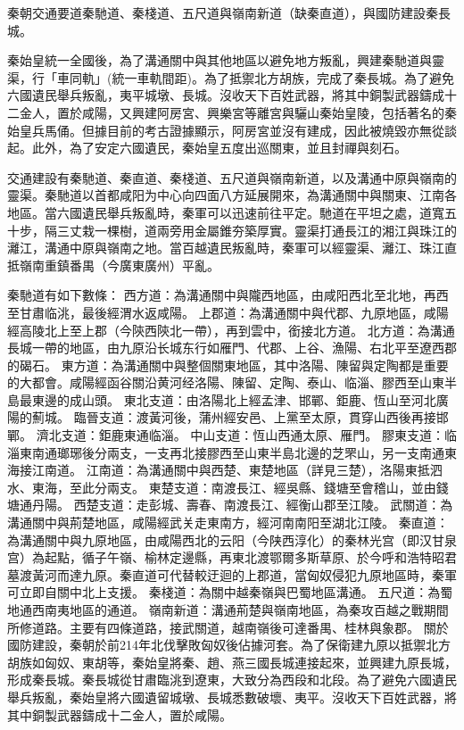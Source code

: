 秦朝交通要道秦馳道、秦棧道、五尺道與嶺南新道（缺秦直道），與國防建設秦長城。

秦始皇統一全國後，為了溝通關中與其他地區以避免地方叛亂，興建秦馳道與靈渠，行「車同軌」(統一車軌間距)。為了抵禦北方胡族，完成了秦長城。為了避免六國遺民舉兵叛亂，夷平城墩、長城。沒收天下百姓武器，將其中銅製武器鑄成十二金人，置於咸陽，又興建阿房宮、興樂宮等離宮與驪山秦始皇陵，包括著名的秦始皇兵馬俑。但據目前的考古證據顯示，阿房宮並沒有建成，因此被燒毀亦無從談起。此外，為了安定六國遺民，秦始皇五度出巡關東，並且封禪與刻石。

交通建設有秦馳道、秦直道、秦棧道、五尺道與嶺南新道，以及溝通中原與嶺南的靈渠。秦馳道以首都咸阳为中心向四面八方延展開來，為溝通關中與關東、江南各地區。當六國遺民舉兵叛亂時，秦軍可以迅速前往平定。馳道在平坦之處，道寬五十步，隔三丈栽一棵樹，道兩旁用金屬錐夯築厚實。靈渠打通長江的湘江與珠江的灕江，溝通中原與嶺南之地。當百越遺民叛亂時，秦軍可以經靈渠、灕江、珠江直抵嶺南重鎮番禺（今廣東廣州）平亂。

秦馳道有如下數條：
西方道：為溝通關中與隴西地區，由咸阳西北至北地，再西至甘肅临洮，最後經渭水返咸陽。
上郡道：為溝通關中與代郡、九原地區，咸陽經高陵北上至上郡（今陝西陝北一帶），再到雲中，銜接北方道。
北方道：為溝通長城一帶的地區，由九原沿长城东行如雁門、代郡、上谷、漁陽、右北平至遼西郡的碣石。
東方道：為溝通關中與整個關東地區，其中洛陽、陳留與定陶都是重要的大都會。咸陽經函谷關沿黄河经洛陽、陳留、定陶、泰山、临淄、膠西至山東半島最東邊的成山頭。
東北支道：由洛陽北上經孟津、邯鄲、鉅鹿、恆山至河北廣陽的薊城。
臨晉支道：渡黃河後，蒲州經安邑、上黨至太原，貫穿山西後再接邯鄲。
濟北支道：鉅鹿東通临淄。
中山支道：恆山西通太原、雁門。
膠東支道：临淄東南通瑯琊後分兩支，一支再北接膠西至山東半島北邊的芝罘山，另一支南通東海接江南道。
江南道：為溝通關中與西楚、東楚地區（詳見三楚），洛陽東抵泗水、東海，至此分兩支。
東楚支道：南渡長江、經吳縣、錢塘至會稽山，並由錢塘通丹陽。
西楚支道：走彭城、壽春、南渡長江、經衡山郡至江陵。
武關道：為溝通關中與荊楚地區，咸陽經武关走東南方，經河南南阳至湖北江陵。
秦直道：為溝通關中與九原地區，由咸陽西北的云阳（今陕西淳化）的秦林光宫（即汉甘泉宫）為起點，循子午嶺、榆林定邊縣，再東北渡鄂爾多斯草原、於今呼和浩特昭君墓渡黃河而達九原。秦直道可代替較迂迴的上郡道，當匈奴侵犯九原地區時，秦軍可立即自關中北上支援。
秦棧道：為關中越秦嶺與巴蜀地區溝通。
五尺道：為蜀地通西南夷地區的通道。
嶺南新道：溝通荊楚與嶺南地區，為秦攻百越之戰期間所修道路。主要有四條道路，接武關道，越南嶺後可達番禺、桂林與象郡。
關於國防建設，秦朝於前214年北伐擊敗匈奴後佔據河套。為了保衛建九原以抵禦北方胡族如匈奴、東胡等，秦始皇將秦、趙、燕三國長城連接起來，並興建九原長城，形成秦長城。秦長城從甘肅臨洮到遼東，大致分為西段和北段。為了避免六國遺民舉兵叛亂，秦始皇將六國遺留城墩、長城悉數破壞、夷平。沒收天下百姓武器，將其中銅製武器鑄成十二金人，置於咸陽。

